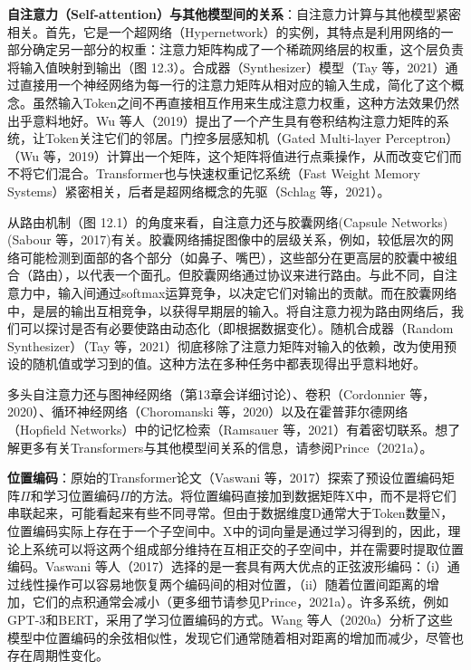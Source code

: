 \documentclass[lang=cn,newtx,10pt,scheme=chinese]{elegantbook}
\begin{document}
\textbf{自注意力（Self-attention）与其他模型间的关系}：自注意力计算与其他模型紧密相关。首先，它是一个超网络（Hypernetwork）的实例，其特点是利用网络的一部分确定另一部分的权重：注意力矩阵构成了一个稀疏网络层的权重，这个层负责将输入值映射到输出（图 12.3）。合成器（Synthesizer）模型（Tay 等，2021）通过直接用一个神经网络为每一行的注意力矩阵从相对应的输入生成，简化了这个概念。虽然输入Token之间不再直接相互作用来生成注意力权重，这种方法效果仍然出乎意料地好。Wu 等人（2019）提出了一个产生具有卷积结构注意力矩阵的系统，让Token关注它们的邻居。门控多层感知机（Gated Multi-layer Perceptron）（Wu 等，2019）计算出一个矩阵，这个矩阵将值进行点乘操作，从而改变它们而不将它们混合。Transformer也与快速权重记忆系统（Fast Weight Memory Systems）紧密相关，后者是超网络概念的先驱（Schlag 等，2021）。

从路由机制（图 12.1）的角度来看，自注意力还与胶囊网络(Capsule Networks)
(Sabour 等，2017)有关。胶囊网络捕捉图像中的层级关系，例如，较低层次的网络可能检测到面部的各个部分（如鼻子、嘴巴），这些部分在更高层的胶囊中被组合（路由），以代表一个面孔。但胶囊网络通过协议来进行路由。与此不同，自注意力中，输入间通过softmax运算竞争，以决定它们对输出的贡献。而在胶囊网络中，是层的输出互相竞争，以获得早期层的输入。将自注意力视为路由网络后，我们可以探讨是否有必要使路由动态化（即根据数据变化）。随机合成器（Random Synthesizer）（Tay 等，2021）彻底移除了注意力矩阵对输入的依赖，改为使用预设的随机值或学习到的值。这种方法在多种任务中都表现得出乎意料地好。

多头自注意力还与图神经网络（第13章会详细讨论）、卷积（Cordonnier 等，2020）、循环神经网络（Choromanski 等，2020）以及在霍普菲尔德网络（Hopfield Networks）中的记忆检索（Ramsauer 等，2021）有着密切联系。想了解更多有关Transformers与其他模型间关系的信息，请参阅Prince（2021a）。

\textbf{位置编码}：原始的Transformer论文（Vaswani 等，2017）探索了预设位置编码矩阵\(\Pi\)和学习位置编码\(\Pi\)的方法。将位置编码直接加到数据矩阵X中，而不是将它们串联起来，可能看起来有些不同寻常。但由于数据维度D通常大于Token数量N，位置编码实际上存在于一个子空间中。X中的词向量是通过学习得到的，因此，理论上系统可以将这两个组成部分维持在互相正交的子空间中，并在需要时提取位置编码。Vaswani 等人（2017）选择的是一套具有两大优点的正弦波形编码：（i）通过线性操作可以容易地恢复两个编码间的相对位置，（ii）随着位置间距离的增加，它们的点积通常会减小（更多细节请参见Prince，2021a）。许多系统，例如GPT-3和BERT，采用了学习位置编码的方式。Wang 等人（2020a）分析了这些模型中位置编码的余弦相似性，发现它们通常随着相对距离的增加而减少，尽管也存在周期性变化。
\end{document}
